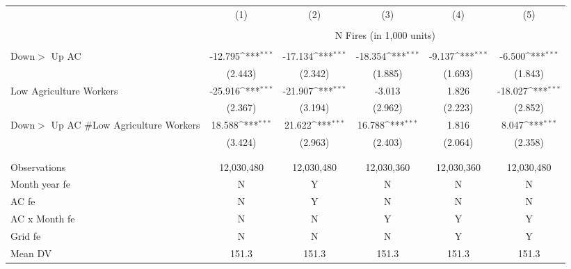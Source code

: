 {\def\sym#1{\ifmmode^{#1}\else\(^{#1}\)\fi}
\begin{tabular}{l*{5}{c}}
\hline
 & (1) & (2) & (3) & (4) & (5) \\\\
 & \multicolumn{5}{c}{N Fires (in 1,000 units)} \\\\ \hline

Down$>$ Up AC&     -12.795\sym{***}&     -17.134\sym{***}&     -18.354\sym{***}&      -9.137\sym{***}&      -6.500\sym{***}\\
            &     (2.443)         &     (2.342)         &     (1.885)         &     (1.693)         &     (1.843)         \\
Low Agriculture Workers&     -25.916\sym{***}&     -21.907\sym{***}&      -3.013         &       1.826         &     -18.027\sym{***}\\
            &     (2.367)         &     (3.194)         &     (2.962)         &     (2.223)         &     (2.852)         \\
Down$>$ Up AC \#Low Agriculture Workers&      18.588\sym{***}&      21.622\sym{***}&      16.788\sym{***}&       1.816         &       8.047\sym{***}\\
            &     (3.424)         &     (2.963)         &     (2.403)         &     (2.064)         &     (2.358)         \\
 & & & & & \\\\
\hline
Observations&  12,030,480         &  12,030,480         &  12,030,360         &  12,030,360         &  12,030,480         \\
Month year fe&           N         &           Y         &           N         &           N         &           N         \\
AC fe       &           N         &           Y         &           N         &           N         &           N         \\
AC x Month fe&           N         &           N         &           Y         &           Y         &           Y         \\
Grid fe     &           N         &           N         &           N         &           Y         &           Y         \\
Mean DV     &       151.3         &       151.3         &       151.3         &       151.3         &       151.3         \\
\hline
\end{tabular}
}

